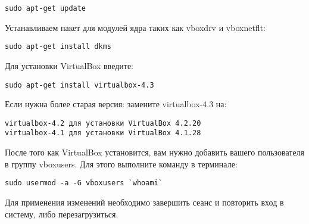 \begin{Verbatim}[frame=single]
sudo apt-get update
\end{Verbatim}

Устанавливаем пакет для модулей ядра таких как vboxdrv и vboxnetflt:

\begin{Verbatim}[frame=single]
sudo apt-get install dkms
\end{Verbatim}

Для установки VirtualBox введите:

\begin{Verbatim}[frame=single]
sudo apt-get install virtualbox-4.3
\end{Verbatim}

Если нужна более старая версия: замените virtualbox-4.3 на:

\begin{Verbatim}[frame=single]
virtualbox-4.2 для установки VirtualBox 4.2.20
virtualbox-4.1 для установки VirtualBox 4.1.28
\end{Verbatim}

После того как VirtualBox установится, вам нужно добавить вашего пользователя в группу vboxusers. Для этого выполните команду в терминале:

\begin{Verbatim}[frame=single]
sudo usermod -a -G vboxusers `whoami`
\end{Verbatim}

Для применения изменений необходимо завершить сеанс и повторить вход в систему, либо перезагрузиться.